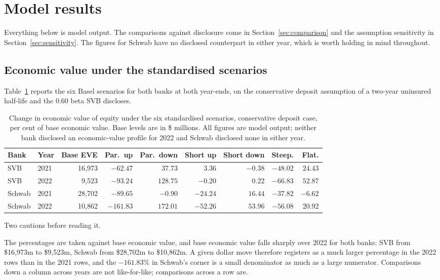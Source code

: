 \section{Model results}
\label{sec:results}

Everything below is model output. The comparisons against disclosure come in
Section~\ref{sec:comparison} and the assumption sensitivity in
Section~\ref{sec:sensitivity}. The figures for Schwab have no disclosed counterpart
in either year, which is worth holding in mind throughout.

\subsection{Economic value under the standardised scenarios}

Table~\ref{tab:scenarios} reports the six Basel scenarios for both banks at both
year-ends, on the conservative deposit assumption of a two-year uninsured half-life
and the 0.60 beta SVB discloses.

\begin{table}[htbp]
\centering
\caption{Change in economic value of equity under the six standardised scenarios,
conservative deposit case, per cent of base economic value. Base levels are in \$
millions. All figures are model output; neither bank disclosed an
economic-value profile for 2022 and Schwab disclosed none in either year.}
\label{tab:scenarios}
\small
\begin{tabular}{llrrrrrrr}
\toprule
Bank & Year & Base EVE & Par.\ up & Par.\ down & Short up & Short down & Steep. & Flat. \\
\midrule
SVB    & 2021 & 16,973 & $-62.47$  & $37.73$  & $3.36$    & $-0.38$  & $-48.02$ & $24.43$ \\
SVB    & 2022 & 9,523  & $-93.24$  & $128.75$ & $-0.20$   & $0.22$   & $-66.83$ & $52.87$ \\
Schwab & 2021 & 28,702 & $-89.65$  & $-0.90$  & $-24.24$  & $16.44$  & $-37.82$ & $-6.62$ \\
Schwab & 2022 & 10,862 & $-161.83$ & $172.01$ & $-52.26$  & $53.96$  & $-56.08$ & $20.92$ \\
\bottomrule
\end{tabular}
\end{table}

Two cautions before reading it.

The percentages are taken against base economic value, and base economic value falls
sharply over 2022 for both banks: SVB from \$16,973m to \$9,523m, Schwab from
\$28,702m to \$10,862m. A given dollar move therefore registers as a much larger
percentage in the 2022 rows than in the 2021 rows, and the $-161.83\%$ in Schwab's
corner is a small denominator as much as a large numerator. Comparisons down a column
across years are not like-for-like; comparisons across a row are.

